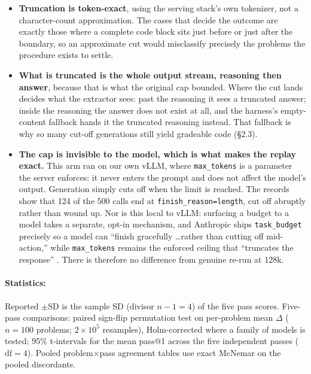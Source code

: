\documentclass[11pt]{article}
\begin{document}
\begin{itemize}
  \item \textbf{Truncation is token-exact}, using the serving stack's own tokenizer, not a
  character-count approximation. The cases that decide the outcome are exactly those where
  a complete code block sits just before or just after the boundary, so an approximate cut
  would misclassify precisely the problems the procedure exists to settle.

  \item \textbf{What is truncated is the whole output stream, reasoning then answer},
  because that is what the original cap bounded. Where the cut lands decides what the
  extractor sees: past the reasoning it sees a truncated answer; inside the reasoning the
  answer does not exist at all, and the harness's empty-content fallback hands it the
  truncated reasoning instead. That fallback is why so many cut-off generations still yield
  gradeable code (\S2.3).

  \item \textbf{The cap is invisible to the model, which is what makes the replay exact.}
  This arm ran on our own vLLM, where \texttt{max\_tokens} is a parameter the
  server enforces: it never enters the prompt and does not affect the model's output. Generation simply cuts off when the limit
  is reached. The records show that 124 of the 500 calls end at
  \texttt{finish\_reason=length}, cut off abruptly rather than wound up. Nor is this local to vLLM: surfacing a budget to a model takes a
  separate, opt-in mechanism, and Anthropic ships \texttt{task\_budget} precisely so a model
  can ``finish gracefully \dots rather than cutting off mid-action,'' while
  \texttt{max\_tokens} remains the enforced ceiling that ``truncates the
  response'' \cite{anthropic2026effort}. There is therefore no difference from genuine re-run at 128k.
\end{itemize}

\paragraph{Statistics:}
Reported $\pm$SD is the sample SD (divisor $n - 1 = 4$) of the five pass scores. Five-pass
comparisons: paired sign-flip permutation test on per-problem mean $\Delta$ ($n = 100$
problems; $2\times10^{5}$ resamples), Holm-corrected where a family of models is tested;
95\% t-intervals for the mean pass@1 across the five independent passes ($\mathrm{df} = 4$). Pooled problem$\times$pass agreement tables use exact
McNemar on the pooled discordants.
\end{document}
